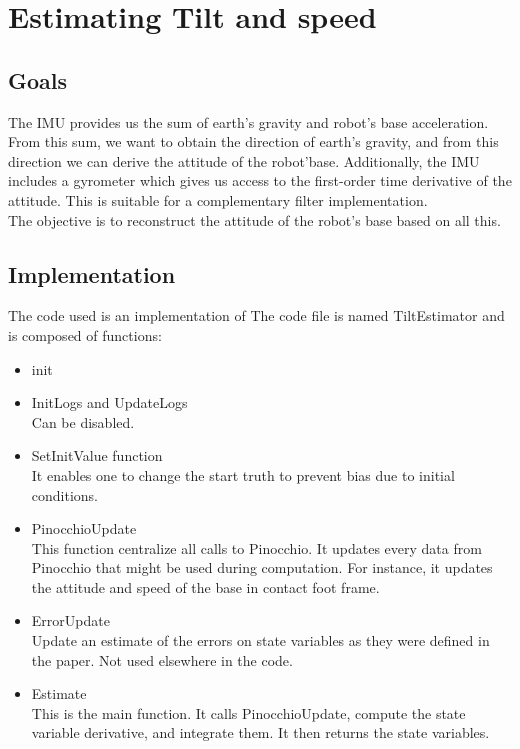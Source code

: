\documentclass[a4paper,10pt]{article}
\begin{document}
\section{Estimating Tilt and speed}
\label{estimating tilt and speed}

\subsection{Goals}
The IMU provides us the sum of earth's gravity and robot's base acceleration. From this sum, we want to obtain the direction of earth's gravity, and from this direction we can derive the attitude of the robot'base. Additionally, the IMU includes a gyrometer which gives us access to the first-order time derivative of the attitude. This is suitable for a complementary filter implementation.\\
The objective is to reconstruct the attitude of the robot's base based on all this. 

\subsection{Implementation}
The code used is an implementation of \cite{Benallegue_2020}
The code file is named TiltEstimator and is composed of functions:
\begin{itemize}
	\item{init}
	\item{InitLogs and UpdateLogs\\Can be disabled.}
	\item{SetInitValue function\\ It enables one to change the start truth to prevent bias due to initial conditions.}
	\item{PinocchioUpdate\\This function centralize all calls to Pinocchio. It updates every data from Pinocchio that might be used during computation. For instance, it updates the attitude and speed of the base in contact foot frame.}
	\item{ErrorUpdate\\ Update an estimate of the errors on state variables as they were defined in the paper. Not used elsewhere in the code.}
	\item{Estimate\\This is the main function. It calls PinocchioUpdate, compute the state variable derivative, and integrate them. It then returns the state variables.}
\end{itemize}
\end{document}
